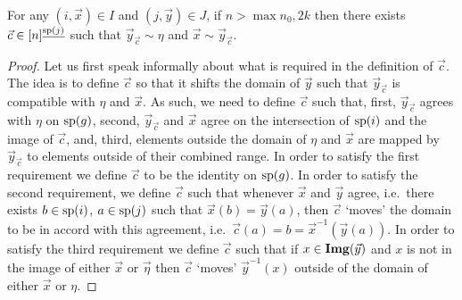 \documentclass[../paper.tex]{subfiles}
\begin{document}
\begin{lem}
	\label{lem:permutation-row-column}
	For any $(i, \vec{x}) \in I$ and $(j, \vec{y}) \in J$, if $n > \max{n_0, 2k}$
  then there exists $\vec{c} \in [n]^{\underline{\text{sp}(j)}}$ such that
  $\vec{y}_{\vec{c}} \sim \eta$ and $\vec{x} \sim \vec{y}_{\vec{c}}$.
\end{lem}

\begin{proof}
  Let us first speak informally about what is required in the definition of
  $\vec{c}$. The idea is to define $\vec{c}$ so that it shifts the domain of $\vec{y}$ such
  that $\vec{y}_{\vec{c}}$ is compatible with $\eta$ and $\vec{x}$. As such, we
  need to define $\vec{c}$ such that, first, $\vec{y}_{\vec{c}}$ agrees with
  $\eta$ on $\text{sp}(g)$, second, $\vec{y}_{\vec{c}}$ and $\vec{x}$ agree on the
  intersection of $\text{sp}(i)$ and the image of $\vec{c}$, and, third,
  elements outside the domain of $\eta$ and $\vec{x}$ are mapped by
  $\vec{y}_{\vec{c}}$ to elements outside of their combined range.
  In order to satisfy the first requirement we define $\vec{c}$ to be
  the identity on $\text{sp}(g)$.  In order to satisfy the second requirement, we
  define $\vec{c}$ such that whenever $\vec{x}$ and $\vec{y}$ agree, i.e.\ there
  exists $b \in \text{sp}(i)$, $a \in \text{sp}(j)$ such that $\vec{x}(b) =
  \vec{y}(a)$, then  $\vec{c}$ `moves' the domain to be in accord with this
  agreement, i.e.\ $\vec{c}(a) = b = \vec{x}^{-1}(\vec{y}(a))$. In order to
  satisfy the third requirement we define $\vec{c}$ such that if $x \in
  \text{\textbf{Img}}(\vec{y})$ and $x$ is not in the image of either $\vec{x}$ or $\vec{\eta}$
  then $\vec{c}$ `moves' $\vec{y}^{-1}(x)$ outside of the domain of either
  $\vec{x}$ or $\eta$.


\end{proof}
\end{document}
